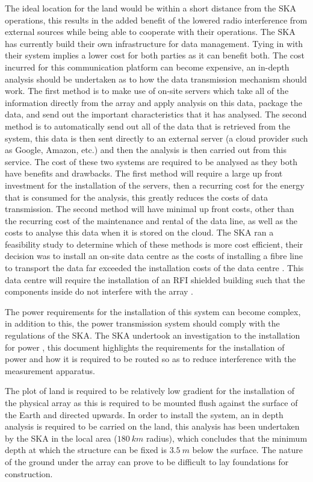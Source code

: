 \documentclass[11pt]{witseiepaper}
\begin{document}
\begin{bibunit}[witseie]
The ideal location for the land would be within a short distance from the SKA operations, this results in the added benefit of the lowered radio interference from external sources while being able to cooperate with their operations. 
The SKA has currently build their own infrastructure for data management. Tying in with their system implies a lower cost for both parties as it can benefit both. The cost incurred for this communication platform can become expensive, an in-depth analysis should be undertaken as to how the data transmission mechanism should work.
The first method is to make use of on-site servers which take all of the information directly from the array and apply analysis on this data, package the data, and send out the important characteristics that it has analysed. The second method is to automatically send out all of the data that is retrieved from the system, this data is then sent directly to an external server (a cloud provider such as Google, Amazon, etc.) and then the analysis is then carried out from this service.
The cost of these two systems are required to be analysed as they both have benefits and drawbacks.
The first method will require a large up front investment for the installation of the servers, then a recurring cost for the energy that is consumed for the analysis, this greatly reduces the costs of data transmission.
The second method will have minimal up front costs, other than the recurring cost of the maintenance and rental of the data line, as well as the costs to analyse this data when it is stored on the cloud.
The SKA ran a feasibility study to determine which of these methods is more cost efficient, their decision was to install an on-site data centre as the costs of installing a fibre line to transport the data far exceeded the installation costs of the data centre \cite[p.~17-18]{SKAFibre}.
This data centre will require the installation of an RFI shielded building such that the components inside do not interfere with the array \cite[p.~18]{SKAFibre}.

The power requirements for the installation of this system can become complex, in addition to this, the power transmission system should comply with the regulations of the SKA. The SKA undertook an investigation to the installation for power \cite{SKAFibre}, this document highlights the requirements for the installation of power and how it is required to be routed so as to reduce interference with the measurement apparatus.


The plot of land is required to be relatively low gradient for the installation of the physical array as this is required to be mounted flush against the surface of the Earth and directed upwards.
In order to install the system, an in depth analysis is required to be carried on the land, this analysis has been undertaken by the SKA in the local area ($180~km$ radius)\cite[p.~95,98]{SKAFibre}, which concludes that the minimum depth at which the structure can be fixed is $3.5~m$ below the surface. The nature of the ground under the array can prove to be difficult to lay foundations for construction.


\end{bibunit}
\end{document}
